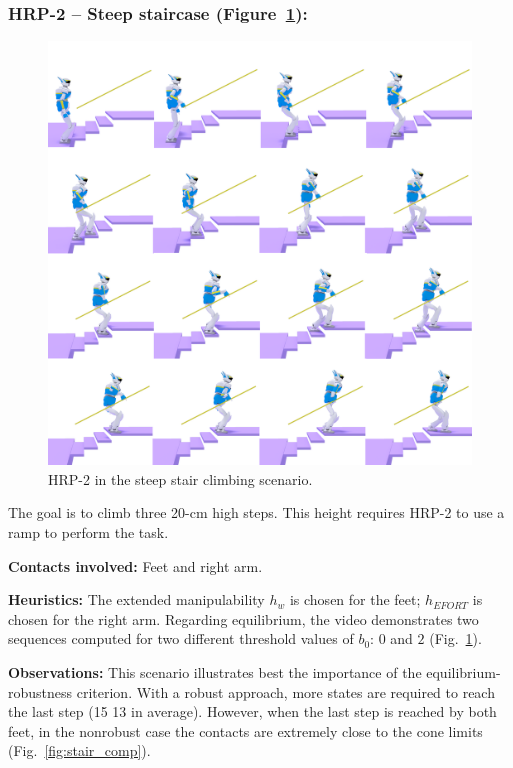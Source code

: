 \subsubsection{HRP-2 -- Steep staircase (Figure~\ref{fig:stair_robust}):}

\begin{figure}
  \centering
  \includegraphics[width=0.5\linewidth]{figures/stair}
  \caption{
           HRP-2 in the steep stair climbing scenario. }
		   \label{fig:stair_robust}
\end{figure}

The goal is to climb three 20-cm high steps. This height requires HRP-2 to use a ramp to  perform the task.

\noindent\textbf{Contacts involved:}  Feet and right arm.

\noindent\textbf{Heuristics:} The extended manipulability $h_w$ is chosen for the feet; $h_{EFORT}$ is chosen for the right arm.
Regarding equilibrium, the video demonstrates two sequences computed for two different threshold values of $b_0$: $0$ and $2$ (Fig.~\ref{fig:stair_robust}). 

\noindent\textbf{Observations:}
This scenario illustrates best the importance of the equilibrium-robustness criterion.
With a robust approach, more states are required to reach the last step (15  13 in average).
However, when the last step is reached by both feet, in the nonrobust case the contacts are extremely close to 
the cone limits (Fig.~\ref{fig:stair_comp}).


